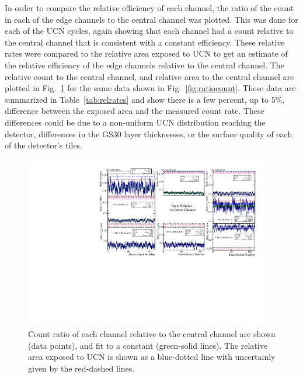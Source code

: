 \documentclass[letter,twocolumn,preprint,3p,numbers,sort&compress]{elsarticle}
\begin{document}
In order to compare the relative efficiency of each channel, the ratio
of the count in each of the edge channels to the central channel was
plotted.  This was done for each of the UCN cycles, again showing that
each channel had a count relative to the central channel that is
consistent with a constant efficiency.  These relative rates were
compared to the relative area exposed to UCN to get an estimate of the
relative efficiency of the edge channels relative to the central
channel.  The relative count to the central channel, and relative area
to the central channel are plotted in Fig.~\ref{fig:relratios} for the
same data shown in Fig.~\ref{fig:ratiocount}.  These data are
summarized in Table~\ref{tab:relrates} and show there is a few
percent, up to 5\%, difference between the exposed area and the
measured count rate.  These differences could be due to a non-uniform
UCN distribution reaching the detector, differences in the GS30 layer
thicknesses, or the surface quality of each of the detector's tiles.


\begin{figure}[!htpb]
\centering
\includegraphics[width=0.95\textwidth]{figures/relratios.pdf}
\caption{ Count ratio of each channel relative to the central channel
  are shown (data points), and fit to a constant (green-solid lines).
  The relative area exposed to UCN is shown as a blue-dotted line with
  uncertainly given by the red-dashed lines.}
\label{fig:relratios}
\end{figure}
\end{document}
